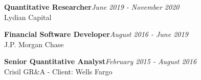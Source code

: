 \documentclass[letterpaper]{article}
\renewenvironment{itemize}{
  \begin{list}{}{
    \setlength{\leftmargin}{1.5em}
  }
}{
  \end{list}
}
\begin{document}
\begin{itemize}
  \item \textbf{Quantitative Researcher}\hfill \emph{June 2019 - November 2020} \\
  Lydian Capital
 
 \item \textbf{Financial Software Developer}\hfill \emph{August 2016 - June 2019} \\
 J.P. Morgan Chase

 \item \textbf{Senior Quantitative Analyst}\hfill \emph{February 2015 - August 2016} \\
 Crisil GR\&A - Client: Wells Fargo
 
\end{itemize}
 
\end{document}

